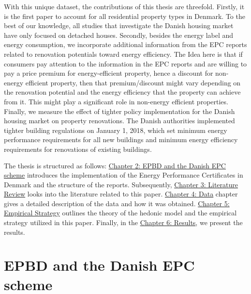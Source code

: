 \documentclass[
  letterpaper,
  DIV=11,
  numbers=noendperiod]{scrreprt}
\begin{document}
With this unique dataset, the contributions of this thesis are
threefold. Firstly, it is the first paper to account for all residential
property types in Denmark. To the best of our knowledge, all studies
that investigate the Danish housing market have only focused on detached
houses. Secondly, besides the energy label and energy consumption, we
incorporate additional information from the EPC reports related to
renovation potentials toward energy efficiency. The Idea here is that if
consumers pay attention to the information in the EPC reports and are
willing to pay a price premium for energy-efficient property, hence a
discount for non-energy efficient property, then that premium/discount
might vary depending on the renovation potential and the energy
efficiency that the property can achieve from it. This might play a
significant role in non-energy efficient properties. Finally, we measure
the effect of tighter policy implementation for the Danish housing
market on property renovations. The Danish authorities implemented
tighter building regulations on January 1, 2018, which set minimum
energy performance requirements for all new buildings and minimum energy
efficiency requirements for renovations of existing buildings.

The thesis is structured as follows:
\href{epbd_and_danish_EPC_scheme.qmd}{Chapter 2: EPBD and the Danish EPC
scheme} introduces the implementation of the Energy Performance
Certificates in Denmark and the structure of the reports. Subsequently,
\href{literature_review.qmd}{Chapter 3: Literature Review} looks into
the literature related to this paper.
\href{data/data_housing.qmd}{Chapter 4: Data} chapter gives a detailed
description of the data and how it was obtained.
\href{empirical_strategy/empirical_strategy_EstimationStrategy.qmd}{Chapter
5: Empirical Strategy} outlines the theory of the hedonic model and the
empirical strategy utilized in this paper. Finally, in the
\href{results.qmd}{Chapter 6: Results}, we present the results.


\chapter{EPBD and the Danish EPC
scheme}\label{epbd-and-the-danish-epc-scheme}
\end{document}
